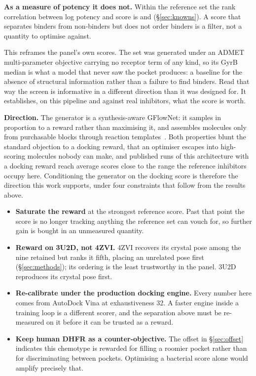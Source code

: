 \documentclass[11pt,a4paper]{article}
\begin{document}
\textbf{As a measure of potency it does not.} Within the reference set the
rank correlation between log potency and score is \knownsSpearmanLo{} and
\knownsSpearmanHi{} (\S\ref{sec:knowns}). A score that separates binders from
non-binders but does not order binders is a filter, not a quantity to
optimise against.

This reframes the panel's own scores. The set was generated under an ADMET
multi-parameter objective carrying no receptor term of any kind, so its GyrB
median is what a model that never saw the pocket produces: a baseline for the
absence of structural information rather than a failure to find binders. Read
that way the screen is informative in a different direction than it was
designed for. It establishes, on this pipeline and against real inhibitors,
what the score is worth.

\textbf{Direction.} The generator is a synthesis-aware GFlowNet: it samples
in proportion to a reward rather than maximising it, and assembles molecules
only from purchasable blocks through reaction templates~\cite{rxnflow}. Both
properties blunt the standard objection to a docking reward, that an
optimiser escapes into high-scoring molecules nobody can make, and published
runs of this architecture with a docking reward reach average scores close to
the range the reference inhibitors occupy here. Conditioning the generator on
the docking score is therefore the direction this work supports, under four
constraints that follow from the results above.

\begin{itemize}\setlength{\itemsep}{0.2em}
\item \textbf{Saturate the reward} at the strongest reference score. Past
that point the score is no longer tracking anything the reference set can
vouch for, so further gain is bought in an unmeasured quantity.
\item \textbf{Reward on 3U2D, not 4ZVI.} 4ZVI recovers its crystal pose among
the nine retained but ranks it fifth, placing an unrelated pose first
(\S\ref{sec:methods}); its ordering is the least trustworthy in the panel.
3U2D reproduces its crystal pose first.
\item \textbf{Re-calibrate under the production docking engine.} Every number
here comes from AutoDock Vina at exhaustiveness 32. A faster engine inside a
training loop is a different scorer, and the separation above must be
re-measured on it before it can be trusted as a reward.
\item \textbf{Keep human DHFR as a counter-objective.} The offset in
\S\ref{sec:offset} indicates this chemotype is rewarded for filling a roomier
pocket rather than for discriminating between pockets. Optimising a bacterial
score alone would amplify precisely that.
\end{itemize}
\end{document}
